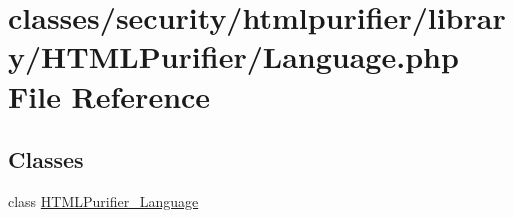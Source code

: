 \hypertarget{Language_8php}{\section{classes/security/htmlpurifier/library/\+H\+T\+M\+L\+Purifier/\+Language.php File Reference}
\label{Language_8php}
}
\subsection*{Classes}
\begin{DoxyCompactItemize}
\item 
class \hyperlink{classHTMLPurifier__Language}{H\+T\+M\+L\+Purifier\+\_\+\+Language}
\end{DoxyCompactItemize}
